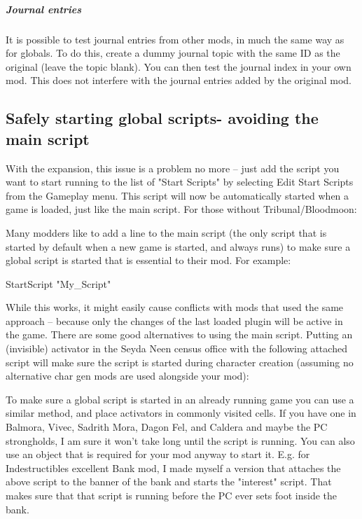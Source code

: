 \hypertarget{journal-entries}{%
\subparagraph{Journal entries}\label{journal-entries}}

It is possible to test journal entries from other mods, in much the same
way as for globals. To do this, create a dummy journal topic with the
same ID as the original (leave the topic blank). You can then test the
journal index in your own mod. This does not interfere with the journal
entries added by the original mod.

\hypertarget{safely-starting-global-scripts--avoiding-the-main-script}{%
\subsection{\texorpdfstring{\hfill\break
Safely starting global scripts- avoiding the main
script}{ Safely starting global scripts- avoiding the main script}}\label{safely-starting-global-scripts--avoiding-the-main-script}}

With the expansion, this issue is a problem no more -- just add the
script you want to start running to the list of "Start Scripts" by
selecting Edit Start Scripts from the Gameplay menu. This script will
now be automatically started when a game is loaded, just like the main
script. For those without Tribunal/Bloodmoon:

Many modders like to add a line to the main script (the only script that
is started by default when a new game is started, and always runs) to
make sure a global script is started that is essential to their mod. For
example:

StartScript "My\_Script"

While this works, it might easily cause conflicts with mods that used
the same approach -- because only the changes of the last loaded plugin
will be active in the game. There are some good alternatives to using
the main script. Putting an (invisible) activator in the Seyda Neen
census office with the following attached script will make sure the
script is started during character creation (assuming no alternative
char gen mods are used alongside your mod):



To make sure a global script is started in an already running game you
can use a similar method, and place activators in commonly visited
cells. If you have one in Balmora, Vivec, Sadrith Mora, Dagon Fel, and
Caldera and maybe the PC strongholds, I am sure it won't take long until
the script is running. You can also use an object that is required for
your mod anyway to start it. E.g. for Indestructibles excellent Bank
mod, I made myself a version that attaches the above script to the
banner of the bank and starts the "interest" script. That makes sure
that that script is running before the PC ever sets foot inside the
bank.

